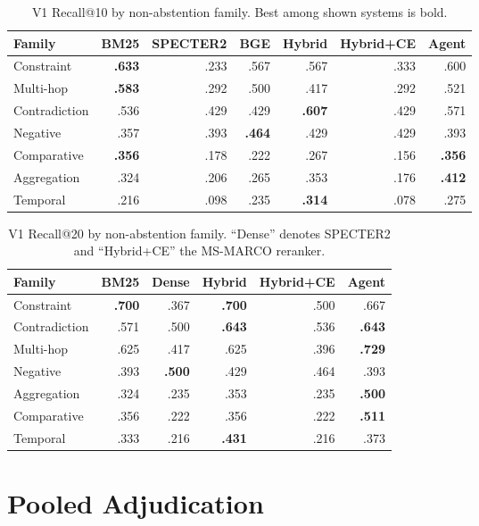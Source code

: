 \documentclass{article}
\begin{document}
\begin{table}[h]
\centering
\caption{V1 Recall@10 by non-abstention family. Best among shown systems is bold.}
\label{tab:r10family}
\small
\begin{tabular}{lrrrrrr}
\toprule
Family & BM25 & SPECTER2 & BGE & Hybrid & Hybrid+CE & Agent \\
\midrule
Constraint & \textbf{.633} & .233 & .567 & .567 & .333 & .600 \\
Multi-hop & \textbf{.583} & .292 & .500 & .417 & .292 & .521 \\
Contradiction & .536 & .429 & .429 & \textbf{.607} & .429 & .571 \\
Negative & .357 & .393 & \textbf{.464} & .429 & .429 & .393 \\
Comparative & \textbf{.356} & .178 & .222 & .267 & .156 & \textbf{.356} \\
Aggregation & .324 & .206 & .265 & .353 & .176 & \textbf{.412} \\
Temporal & .216 & .098 & .235 & \textbf{.314} & .078 & .275 \\
\bottomrule
\end{tabular}
\end{table}

\begin{table}[h]
\centering
\caption{V1 Recall@20 by non-abstention family. ``Dense'' denotes SPECTER2 and ``Hybrid+CE'' the MS-MARCO reranker.}
\label{tab:r20family}
\small
\begin{tabular}{lrrrrr}
\toprule
Family & BM25 & Dense & Hybrid & Hybrid+CE & Agent \\
\midrule
Constraint & \textbf{.700} & .367 & \textbf{.700} & .500 & .667 \\
Contradiction & .571 & .500 & \textbf{.643} & .536 & \textbf{.643} \\
Multi-hop & .625 & .417 & .625 & .396 & \textbf{.729} \\
Negative & .393 & \textbf{.500} & .429 & .464 & .393 \\
Aggregation & .324 & .235 & .353 & .235 & \textbf{.500} \\
Comparative & .356 & .222 & .356 & .222 & \textbf{.511} \\
Temporal & .333 & .216 & \textbf{.431} & .216 & .373 \\
\bottomrule
\end{tabular}
\end{table}

\section{Pooled Adjudication}
\label{app:pooling}
\end{document}
